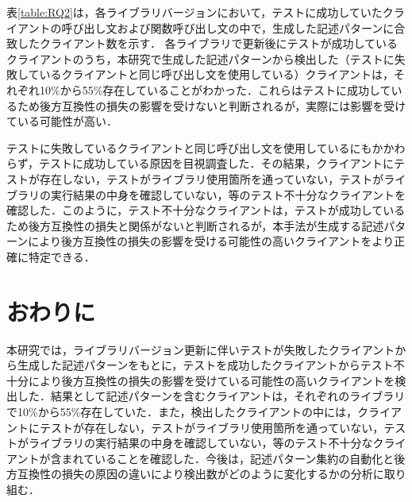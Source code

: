 \documentclass[T,J]{fose} %
\begin{document}
表\ref{table:RQ2}は，各ライブラリバージョンにおいて，テストに成功していたクライアントの呼び出し文および関数呼び出し文の中で，生成した記述パターンに合致したクライアント数を示す．
各ライブラリで更新後にテストが成功しているクライアントのうち，本研究で生成した記述パターンから検出した（テストに失敗しているクライアントと同じ呼び出し文を使用している）クライアントは，それぞれ10\%から55\%存在していることがわかった．これらはテストに成功しているため後方互換性の損失の影響を受けないと判断されるが，実際には影響を受けている可能性が高い．

テストに失敗しているクライアントと同じ呼び出し文を使用しているにもかかわらず，テストに成功している原因を目視調査した．その結果，クライアントにテストが存在しない，テストがライブラリ使用箇所を通っていない，テストがライブラリの実行結果の中身を確認していない，等のテスト不十分なクライアントを確認した．このように，テスト不十分なクライアントは，テストが成功しているため後方互換性の損失と関係がないと判断されるが，本手法が生成する記述パターンにより後方互換性の損失の影響を受ける可能性の高いクライアントをより正確に特定できる．

\section{おわりに}\label{sec:conclusion}
本研究では，ライブラリバージョン更新に伴いテストが失敗したクライアントから生成した記述パターンをもとに，テストを成功したクライアントからテスト不十分により後方互換性の損失の影響を受けている可能性の高いクライアントを検出した．結果として記述パターンを含むクライアントは，それぞれのライブラリで10\%から55\%存在していた．また，検出したクライアントの中には，クライアントにテストが存在しない，テストがライブラリ使用箇所を通っていない，テストがライブラリの実行結果の中身を確認していない，等のテスト不十分なクライアントが含まれていることを確認した．今後は，記述パターン集約の自動化と後方互換性の損失の原因の違いにより検出数がどのように変化するかの分析に取り組む．







\end{document}
